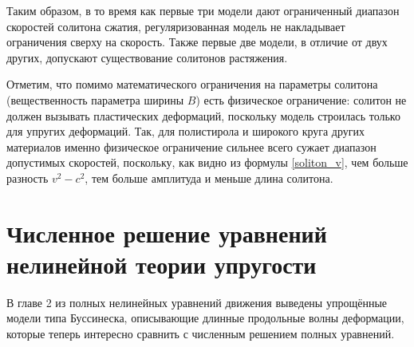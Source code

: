 \documentclass[12pt, a4paper]{report}
\begin{document}
Таким образом, в то время как первые три модели дают ограниченный диапазон скоростей солитона сжатия, регуляризованная модель не накладывает ограничения сверху на скорость. Также первые две модели, в отличие от двух других, допускают существование солитонов растяжения. 

Отметим, что помимо математического ограничения на параметры солитона (вещественность параметра ширины $B$) есть физическое ограничение: солитон не должен вызывать пластических деформаций, поскольку модель строилась только для упругих деформаций. Так, для полистирола и широкого круга других материалов именно физическое ограничение сильнее всего сужает диапазон допустимых скоростей, поскольку, как видно из формулы \eqref{soliton_v}, чем больше разность ${v^2-c^2}$, тем больше амплитуда и меньше длина солитона.



\chapter{Численное решение уравнений нелинейной теории упругости}
В главе 2 из полных нелинейных уравнений движения 
выведены упрощённые модели типа Буссинеска, описывающие длинные продольные волны деформации, которые теперь интересно сравнить с численным решением полных уравнений.
\end{document}
